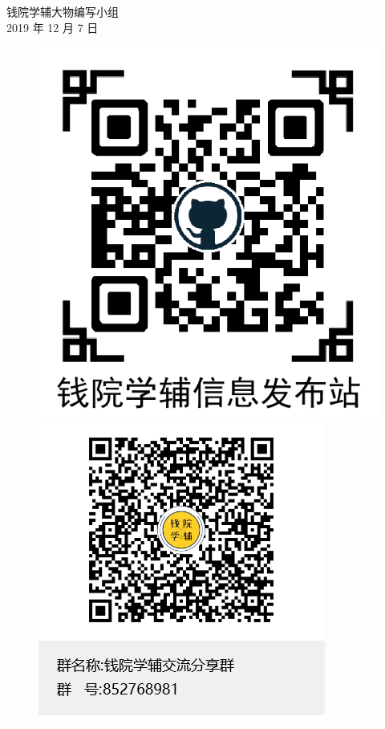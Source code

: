 \begin{flushright}
	钱院学辅大物编写小组\\
	2019 年 12 月 7 日
\end{flushright}
\vspace{1.0cm}
\begin{figure}[!h]
	\centering
	\begin{minipage}[c]{0.5\textwidth}
		\centering
		\includegraphics[scale=0.5]{./template/qrcode2.png}
	\end{minipage}%
	\begin{minipage}[c]{0.5\textwidth}
		\centering
		\includegraphics[scale=0.5]{./template/new_group.png}
	\end{minipage}
\end{figure}


\cleardoublepage
\tableofcontents